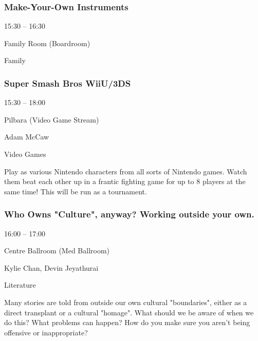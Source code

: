 \documentclass{scrreprt}
\begin{document}
\begin{multicols}{2}
\subsubsection*{Make-Your-Own Instruments}\begin{description}
\setlength{\itemsep}{0pt}
\setlength{\parsep}{0pt}
\setlength{\parskip}{0pt}
\item[Time:]{15:30 -- 16:30}
\item[Venue:]{Family Room (Boardroom)}
\item[Tags:]{Family}\end{description}

\subsubsection*{Super Smash Bros WiiU/3DS}\begin{description}
\setlength{\itemsep}{0pt}
\setlength{\parsep}{0pt}
\setlength{\parskip}{0pt}
\item[Time:]{15:30 -- 18:00}
\item[Venue:]{Pilbara (Video Game Stream)}
\item[People:]{Adam McCaw}
\item[Tags:]{Video Games}\end{description}
Play as various Nintendo characters from all sorts of Nintendo games. Watch them beat each other up in a frantic fighting game for up to 8 players at the same time! This will be run as a tournament.
\subsubsection*{Who Owns "Culture", anyway? Working outside your own.}\begin{description}
\setlength{\itemsep}{0pt}
\setlength{\parsep}{0pt}
\setlength{\parskip}{0pt}
\item[Time:]{16:00 -- 17:00}
\item[Venue:]{Centre Ballroom (Med Ballroom)}
\item[People:]{Kylie Chan, Devin Jeyathurai}
\item[Tags:]{Literature}\end{description}
Many stories are told from outside our own cultural "boundaries", either as a direct transplant or a cultural "homage". What should we be aware of when we do this? What problems can happen? How do you make sure you aren't being offensive or inappropriate?

\end{multicols}
\end{document}
